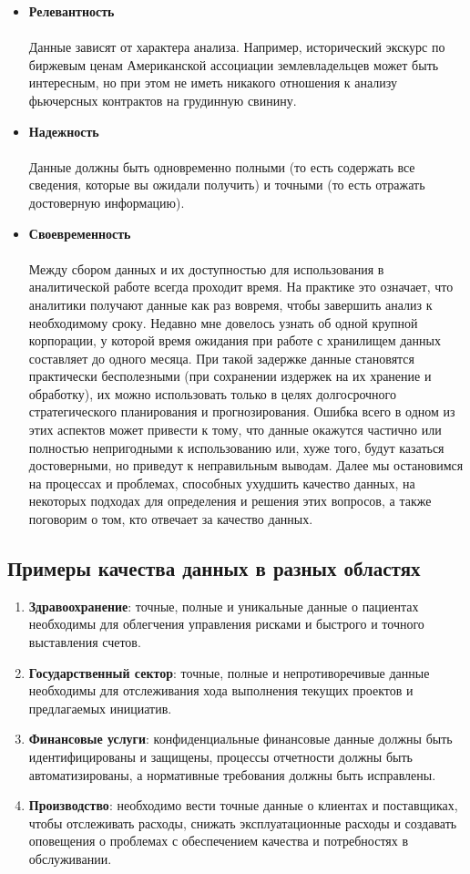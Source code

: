 \documentclass{article}
\begin{document}
\begin{itemize}
    \item \textbf{Релевантность} \\ \\
    Данные зависят от характера анализа. Например, исторический экскурс по биржевым ценам Американской ассоциации землевладельцев может быть интересным, но при этом не иметь никакого отношения к анализу фьючерсных контрактов на грудинную свинину.
    \item \textbf{Надежность} \\ \\
    Данные должны быть одновременно полными (то есть содержать все сведения, которые вы ожидали получить) и точными (то есть отражать достоверную информацию).
    \item \textbf{Своевременность} \\ \\
    Между сбором данных и их доступностью для использования в аналитической работе всегда проходит время. На практике это означает, что аналитики получают данные как раз вовремя, чтобы завершить анализ к необходимому сроку. Недавно мне довелось узнать об одной крупной корпорации, у которой время ожидания при работе с хранилищем данных составляет до одного месяца. При такой задержке данные становятся практически бесполезными (при сохранении издержек на их хранение и обработку), их можно использовать только в целях долгосрочного стратегического планирования и прогнозирования.
    Ошибка всего в одном из этих аспектов может привести к тому, что данные окажутся частично или полностью непригодными к использованию или, хуже того, будут казаться достоверными, но приведут к неправильным выводам.
    Далее мы остановимся на процессах и проблемах, способных ухудшить качество данных, на некоторых подходах для определения и решения этих вопросов, а также поговорим о том, кто отвечает за качество данных.
\end{itemize}

\subsection{Примеры качества данных в разных областях}

\begin{enumerate}
    \item \textbf{Здравоохранение}: точные, полные и уникальные данные о пациентах необходимы для облегчения управления рисками и быстрого и точного выставления счетов.
    \item \textbf{Государственный сектор}: точные, полные и непротиворечивые данные необходимы для отслеживания хода выполнения текущих проектов и предлагаемых инициатив.
    \item \textbf{Финансовые услуги}: конфиденциальные финансовые данные должны быть идентифицированы и защищены, процессы отчетности должны быть автоматизированы, а нормативные требования должны быть исправлены.‍
    \item \textbf{Производство}: необходимо вести точные данные о клиентах и поставщиках, чтобы отслеживать расходы, снижать эксплуатационные расходы и создавать оповещения о проблемах с обеспечением качества и потребностях в обслуживании. 
\end{enumerate}
\end{document}
